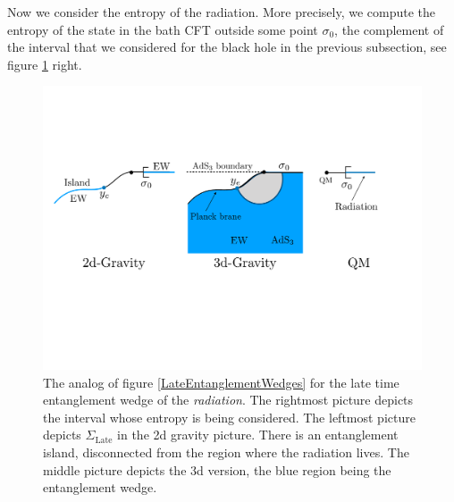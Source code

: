 \documentclass[12pt]{article}
\begin{document}
Now we consider the entropy of the radiation. 
More precisely, we compute the entropy of the state in the bath CFT outside some point $\sigma_0$, the complement of the interval that we considered for the black hole in the previous subsection, see figure \ref{RadiationEW} right.
\begin{figure}[ht]
    \begin{center}
    \includegraphics[scale=.5]{Figures/RadiationEW}
    \end{center}
    \caption{The analog of figure \ref{LateEntanglementWedges} for the late time entanglement wedge of the \emph{radiation}.
     The rightmost picture depicts the interval whose entropy is being considered.
     The leftmost picture depicts $\Sigma_\text{Late}$ in the 2d gravity picture.
     There is an entanglement island, disconnected from the region where the radiation lives. 
     The middle picture depicts the 3d version, the blue region being the entanglement wedge.}
    \label{RadiationEW}
\end{figure}
\end{document}
